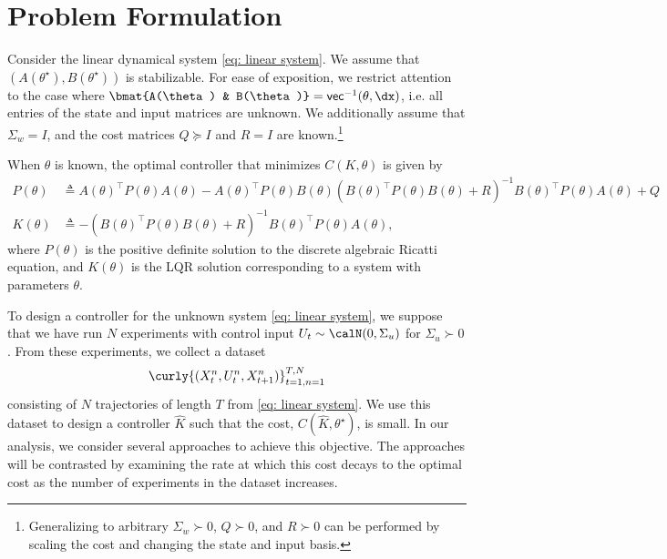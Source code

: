 \section{Problem Formulation}

Consider the linear dynamical system \eqref{eq: linear system}. We assume that$(A(\theta^\star), B(\theta^\star))$ is stabilizable. For ease of exposition, we restrict attention to the case where $\bmat{A(\theta) & B(\theta)} = \mathsf{vec}^{-1}(\theta, \dx)$, i.e. all entries of the state and input matrices are unknown. We additionally assume that $\Sigma_w = I$, and the cost matrices $Q\succeq I$ and $R = I$ are known.\footnote{Generalizing to arbitrary $\Sigma_w \succ 0$, $Q\succ 0$, and $R\succ 0$ can be performed by scaling the cost and changing the state and input basis. }

When $\theta$ is known, the optimal controller that minimizes $C(K, \theta)$ is given by 
\begin{align*}
    P(\theta) &\triangleq A(\theta)^\top P(\theta) A(\theta) - A(\theta)^\top P(\theta) B(\theta) (B(\theta)^\top P(\theta)  B(\theta)+ R)^{-1} B(\theta)^\top P(\theta) A(\theta)+ Q \\
    K(\theta) &\triangleq -(B(\theta)^\top P(\theta) B(\theta) + R)^{-1} B(\theta)^\top P(\theta) A(\theta),
\end{align*}
where $P(\theta)$ is the positive definite solution to the discrete algebraic Ricatti equation, and $K(\theta)$ is the LQR solution corresponding to a system with parameters $\theta$. 

To design a controller for the unknown system \eqref{eq: linear system}, we suppose that we have run $N$ experiments with control input $U_t \sim \calN(0, \Sigma_u)$ for $\Sigma_u \succ 0$.  From these experiments, we collect a dataset 
\begin{align}
    \label{eq: dataset}
    \curly{(X_t^n, U_t^n, X_{t+1}^n)}_{t=1, n=1}^{T,N}
\end{align} consisting of $N$ trajectories of length $T$ from \eqref{eq: linear system}. We use this dataset to design a controller $\hat K$ such that the cost, $C(\hat K, \theta^\star)$,
is small. In our analysis, we consider several approaches to achieve this objective. The approaches will be  contrasted by examining the rate at which this cost decays to the optimal cost as the number of experiments in the dataset increases.